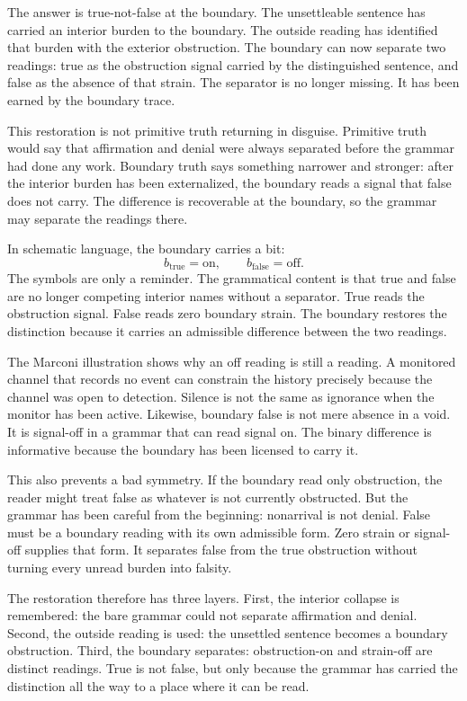 The answer is true-not-false at the boundary. The unsettleable sentence has
carried an interior burden to the boundary. The outside reading has
identified that burden with the exterior obstruction. The boundary can now
separate two readings: true as the obstruction signal carried by the
distinguished sentence, and false as the absence of that strain. The
separator is no longer missing. It has been earned by the boundary trace.

This restoration is not primitive truth returning in disguise. Primitive
truth would say that affirmation and denial were always separated before the
grammar had done any work. Boundary truth says something narrower and
stronger: after the interior burden has been externalized, the boundary
reads a signal that false does not carry. The difference is recoverable at
the boundary, so the grammar may separate the readings there.

In schematic language, the boundary carries a bit:
\[
  b_{\mathrm{true}} = \mathrm{on},
  \qquad
  b_{\mathrm{false}} = \mathrm{off}.
\]
The symbols are only a reminder. The grammatical content is that true and
false are no longer competing interior names without a separator. True reads
the obstruction signal. False reads zero boundary strain. The boundary
restores the distinction because it carries an admissible difference between
the two readings.

The Marconi illustration shows why an off reading is still a reading. A
monitored channel that records no event can constrain the history precisely
because the channel was open to detection. Silence is not the same as
ignorance when the monitor has been active. Likewise, boundary false is not
mere absence in a void. It is signal-off in a grammar that can read signal
on. The binary difference is informative because the boundary has been
licensed to carry it.

This also prevents a bad symmetry. If the boundary read only obstruction,
the reader might treat false as whatever is not currently obstructed. But
the grammar has been careful from the beginning: nonarrival is not denial.
False must be a boundary reading with its own admissible form. Zero strain
or signal-off supplies that form. It separates false from the true
obstruction without turning every unread burden into falsity.

The restoration therefore has three layers. First, the interior collapse is
remembered: the bare grammar could not separate affirmation and denial.
Second, the outside reading is used: the unsettled sentence becomes a
boundary obstruction. Third, the boundary separates: obstruction-on and
strain-off are distinct readings. True is not false, but only because the
grammar has carried the distinction all the way to a place where it can be
read.

